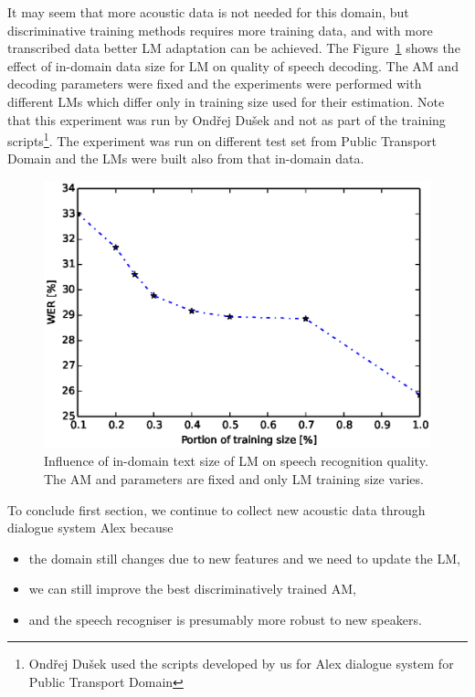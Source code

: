 It may seem that more acoustic data is not needed for this domain, but discriminative training methods requires more training data, and with more transcribed data better \ac{LM} adaptation can be achieved.
The Figure~\ref{fig:partials_lm} shows the effect of in-domain data size for \ac{LM} on quality of speech decoding.
The \ac{AM}  and decoding parameters were fixed and the experiments were performed with different \acp{LM} which differ only in training size used for their estimation. 
Note that this experiment was run by Ondřej Dušek and not as part of the training scripts\footnote{Ondřej Dušek used the scripts developed by us for Alex dialogue system for Public Transport Domain}.
The experiment was run on different test set from Public Transport Domain and the \acp{LM} were built also from that in-domain data.
\begin{figure}[!htp]
    \begin{center}
    \includegraphics[scale=0.7]{images/partial-lm-tri2b-bmmi.ps}
    \caption{Influence of in-domain text size of \ac{LM} on speech recognition quality. The \ac{AM}  and parameters are fixed and only \ac{LM} training size varies.}
    \label{fig:partials_lm} 
    \end{center}
\end{figure}

To conclude first section, we continue to collect new acoustic data through dialogue system Alex because
\begin{itemize}
    \item the domain still changes due to new features and we need to update the \ac{LM},
    \item we can still improve the best discriminatively trained \ac{AM},
    \item and the speech recogniser is presumably more robust to new speakers.
\end{itemize}

